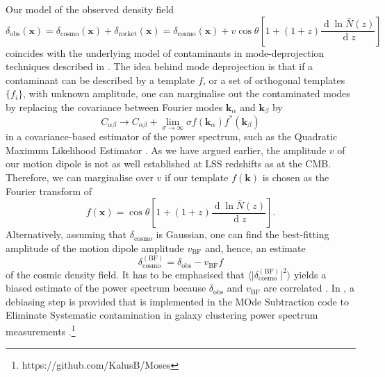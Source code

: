 \documentclass[a4paper,11pt]{article}
\renewcommand{\d}{\operatorname{d}}
\begin{document}
 Our model of the observed density field 
 \begin{equation}
     \delta_\mathrm{obs}(\mathbf{x}) = \delta_\mathrm{cosmo}(\mathbf{x}) + \delta_\mathrm{rocket}(\mathbf{x}) = \delta_\mathrm{cosmo}(\mathbf{x}) + v \cos\theta\left[1 + (1 + z)\frac{\d \ln \bar N(z)}{\d z}\right]
     \label{eq:rocket_as_contaminant}
 \end{equation}
 coincides with the underlying model of contaminants in mode-deprojection techniques described in \cite{Slosar:2004fr,Ho:2008bz,Pullen:2012rd,Elsner:2015aga,Kalus:2016cno,Elsner:2016bvs,Kalus:2018qsy}. The idea behind mode deprojection \cite{Rybicki:1992jz} is that if a contaminant can be described by a template $f$, or a set of orthogonal templates $\lbrace f_i \rbrace$, with unknown amplitude, one can marginalise out the contaminated modes by replacing the covariance between Fourier modes $\mathbf{k}_\alpha$ and $\mathbf{k}_\beta$ by
 \begin{equation}
     C_{\alpha\beta} \rightarrow C_{\alpha\beta} + \lim_{\sigma\rightarrow\infty}\sigma f(\mathbf{k}_\alpha)f^\ast(\mathbf{k}_\beta)
 \end{equation}
 in a covariance-based estimator of the power spectrum, such as the Quadratic Maximum Likelihood Estimator \cite[QML]{Tegmark:1996qt}. As we have argued earlier, the amplitude $v$ of our motion dipole is not as well established at LSS redshifts as at the CMB. Therefore, we can marginalise over $v$ if our template $f(\mathbf{k})$ is chosen as the Fourier transform of 
\begin{equation}
     f(\mathbf{x}) = \cos\theta\left[1 + (1 + z)\frac{\d \ln \bar N(z)}{\d z}\right].
 \end{equation}
 Alternatively, assuming that $\delta_\mathrm{cosmo}$ is Gaussian, one can find the best-fitting amplitude of the motion dipole amplitude $v_\mathrm{BF}$ and, hence, an estimate
 \begin{equation}
     \delta_\mathrm{cosmo}^\mathrm{(BF)} = \delta_\mathrm{obs} - v_\mathrm{BF}f
     \label{eq:linear_contamination}
 \end{equation}
 of the cosmic density field. It has to be emphasised that 
 $\langle \vert \delta_\mathrm{cosmo}^\mathrm{(BF)} \vert^2\rangle$
 yields a biased estimate of the power spectrum because $\delta_\mathrm{obs}$ and $v_\mathrm{BF}$ are correlated \cite{Elsner:2015aga}. In \cite{Kalus:2016cno}, a debiasing step is provided that is implemented in the MOde Subtraction code to Eliminate Systematic contamination in galaxy clustering power spectrum measurements \cite[MOSES]{Kalus:2018qsy}.\footnote{https://github.com/KalusB/Moses}
\end{document}
